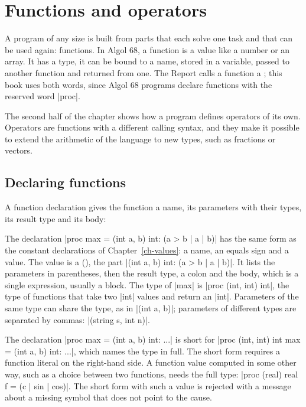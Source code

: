 \chapter{Functions and operators}\label{ch-procs}

A program of any size is built from parts that each solve one task and
that can be used again: functions. In Algol 68, a function is a value like
a number or an array. It has a type, it can be bound to a name, stored in
a variable, passed to another function and returned from one. The Report
calls a function a ; this book uses both words, since
Algol 68 programs declare functions with the reserved word \code|proc|.

The second half of the chapter shows how a program defines operators of
its own. Operators are functions with a different calling syntax, and
they make it possible to extend the arithmetic of the language to new
types, such as fractions or vectors.

\section{Declaring functions}\label{sec-proc-decl}

A function declaration gives the function a name, its parameters with
their types, its result type and its body:


The declaration \code|proc max = (int a, b) int: (a > b | a | b)| has the
same form as the constant declarations of Chapter~\ref{ch-values}: a name, an equals
sign and a value. The value is a 
(), the part \code|(int a, b) int: (a > b | a | b)|. It
lists the parameters in parentheses, then the result type, a colon and
the body, which is a single expression, usually a block. The type of
\code|max| is \code|proc (int, int) int|, the type of functions that take
two \code|int| values and return an \code|int|. Parameters of the same
type can share the type, as in \code|(int a, b)|; parameters of different
types are separated by commas: \code|(string s, int n)|.

The declaration \code|proc max = (int a, b) int: ...| is short for
\code|proc (int, int) int max = (int a, b) int: ...|, which names the
type in full. The short form requires a function literal on the
right-hand side. A function value computed in some other way, such as a
choice between two functions, needs the full type:
\code|proc (real) real f = (c | sin | cos)|. The short form with such a
value is rejected with a message about a missing symbol that does not
point to the cause.

